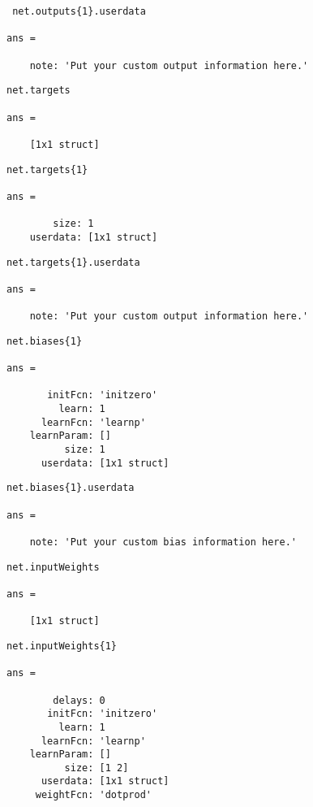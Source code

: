 \begin{verbatim}
 net.outputs{1}.userdata

ans = 

    note: 'Put your custom output information here.'
\end{verbatim}

\begin{verbatim}
net.targets

ans = 

    [1x1 struct]
\end{verbatim}

\begin{verbatim}
net.targets{1}

ans =

        size: 1
    userdata: [1x1 struct]
\end{verbatim}

\begin{verbatim}
net.targets{1}.userdata

ans = 

    note: 'Put your custom output information here.'
\end{verbatim}

\begin{verbatim}
net.biases{1}

ans =

       initFcn: 'initzero'
         learn: 1
      learnFcn: 'learnp'
    learnParam: []
          size: 1
      userdata: [1x1 struct]
\end{verbatim}


\begin{verbatim}
net.biases{1}.userdata

ans =

    note: 'Put your custom bias information here.'
\end{verbatim}


\begin{verbatim}
net.inputWeights

ans = 

    [1x1 struct]
\end{verbatim}


\begin{verbatim}
net.inputWeights{1}

ans = 

        delays: 0
       initFcn: 'initzero'
         learn: 1
      learnFcn: 'learnp'
    learnParam: []
          size: [1 2]
      userdata: [1x1 struct]
     weightFcn: 'dotprod'
\end{verbatim}

